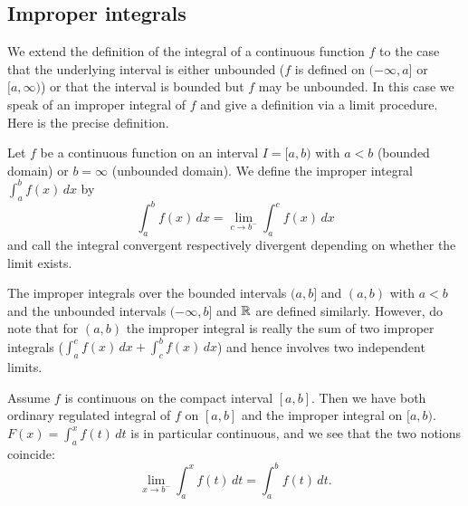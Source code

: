 \documentclass[10pt, a4paper]{article}
\begin{document}
\subsection{Improper integrals}
We extend the definition of the integral of a continuous function $f$ to the case that the underlying interval is either unbounded
($f$ is defined on $(-\infty, a]$ or $[a, \infty)$)
or that the interval is bounded but $f$ may be unbounded.
In this case we speak of an improper integral of $f$ and give a definition via a limit procedure.
Here is the precise definition.

\begin{definition}
    Let $f$ be a continuous function on an interval $I = [a, b)$ with $a < b$
    (bounded domain)
    or $b = \infty$
    (unbounded domain).
    We define the improper integral $\int_{a}^{b}f(x)\,dx$ by
    \[
    \int_{a}^{b}f(x)\,dx = \lim_{c \rightarrow b ^ {-}}\int_{a}^{c}f(x)\,dx
    \]
    and call the integral convergent respectively divergent depending on whether the limit exists.

    The improper integrals over the bounded intervals $(a, b]$ and $(a, b)$ with $a < b$ and the unbounded intervals $(-\infty, b]$ and $\mathbb{R}$ are defined similarly.
    However,
    do note that for $(a, b)$ the improper integral is really the sum of two improper integrals
    ($\int_{a}^{c}f(x)\,dx + \int_{c}^{b}f(x)\,dx$)
    and hence involves two independent limits.
\end{definition}

\begin{remark}
    Assume $f$ is continuous on the compact interval $[a, b]$.
    Then we have both ordinary regulated integral of $f$ on $[a, b]$ and the improper integral on $[a, b)$.
    $F(x) = \int_{a}^{x}f(t)\,dt$ is in particular continuous,
    and we see that the two notions coincide:
    \[
    \lim_{x \rightarrow b ^ {-}}\int_{a}^{x}f(t)\,dt = \int_{a}^{b}f(t)\,dt.
    \]
\end{remark}
\end{document}
